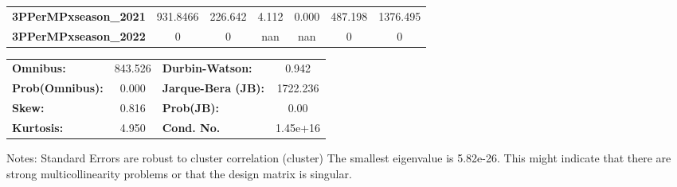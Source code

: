 \begin{center}
\begin{tabular}{lcccccc}
\textbf{3PPerMPxseason\_2021} &     931.8466  &      226.642     &     4.112  &         0.000        &      487.198    &     1376.495     \\
\textbf{3PPerMPxseason\_2022} &            0  &            0     &       nan  &           nan        &            0    &            0     \\
\bottomrule
\end{tabular}
\begin{tabular}{lclc}
\textbf{Omnibus:}       & 843.526 & \textbf{  Durbin-Watson:     } &    0.942  \\
\textbf{Prob(Omnibus):} &   0.000 & \textbf{  Jarque-Bera (JB):  } & 1722.236  \\
\textbf{Skew:}          &   0.816 & \textbf{  Prob(JB):          } &     0.00  \\
\textbf{Kurtosis:}      &   4.950 & \textbf{  Cond. No.          } & 1.45e+16  \\
\bottomrule
\end{tabular}
\end{center}

Notes: \newline
 [1] Standard Errors are robust to cluster correlation (cluster) \newline
 [2] The smallest eigenvalue is 5.82e-26. This might indicate that there are \newline
 strong multicollinearity problems or that the design matrix is singular.